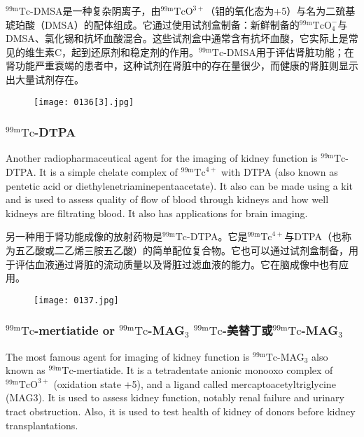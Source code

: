 \documentclass[dvipsnames, svgnames,a4paper,11pt]{article}
\begin{document}
${}^\mathrm{99m}\mathrm{Tc}$-DMSA是一种复杂阴离子，由${}^\mathrm{99m}\mathrm{TcO^{3+}}$（钼的氧化态为+5）与名为二巯基琥珀酸（DMSA）的配体组成。它通过使用试剂盒制备：新鲜制备的${}^\mathrm{99m}\mathrm{TcO_4^-}$与DMSA、氯化锡和抗坏血酸混合。这些试剂盒中通常含有抗坏血酸，它实际上是常见的维生素C，起到还原剂和稳定剂的作用。${}^\mathrm{99m}\mathrm{Tc}$-DMSA用于评估肾脏功能；在肾功能严重衰竭的患者中，这种试剂在肾脏中的存在量很少，而健康的肾脏则显示出大量试剂存在。

\begin{figure}[h]
	\centering
    \texttt{[image: 0136[3].jpg]}    
     \label{fig140}
\end{figure}

\subsubsection{${}^\mathrm{99m}\mathrm{Tc}$-DTPA}

Another radiopharmaceutical agent for the imaging of kidney function is ${}^\mathrm{99m}\mathrm{Tc}$-DTPA.
It is a simple chelate complex of ${}^\mathrm{99m}\mathrm{Tc}^{4+}$ with DTPA (also known as pentetic acid or
diethylenetriaminepentaacetate). It also can be made using a kit and is used to
assess quality of flow of blood through kidneys and how well kidneys are filtrating
blood. It also has applications for brain imaging.

另一种用于肾功能成像的放射药物是${}^\mathrm{99m}\mathrm{Tc}$-DTPA。它是${}^\mathrm{99m}\mathrm{Tc}^{4+}$与DTPA（也称为五乙酸或二乙烯三胺五乙酸）的简单配位复合物。它也可以通过试剂盒制备，用于评估血液通过肾脏的流动质量以及肾脏过滤血液的能力。它在脑成像中也有应用。

\begin{figure}[h]
	\centering
    \texttt{[image: 0137.jpg]}    
     \label{fig141}
\end{figure}

\subsubsection{${}^\mathrm{99m}\mathrm{Tc}$-mertiatide or ${}^\mathrm{99m}\mathrm{Tc}$-MAG${}_3$ ${}^\mathrm{99m}\mathrm{Tc}$-美替丁或${}^\mathrm{99m}\mathrm{Tc}$-MAG${}_3$}

The most famous agent for imaging of kidney function is ${}^\mathrm{99m}\mathrm{Tc}$-MAG${}_3$ also known as
${}^\mathrm{99m}\mathrm{Tc}$-mertiatide. It is a tetradentate anionic monooxo complex of ${}^\mathrm{99m}\mathrm{TcO^{3+}}$ (oxidation
state +5), and a ligand called mercaptoacetyltriglycine (MAG3). It is used to assess
kidney function, notably renal failure and urinary tract obstruction. Also, it is used to
test health of kidney of donors before kidney transplantations.
\end{document}
